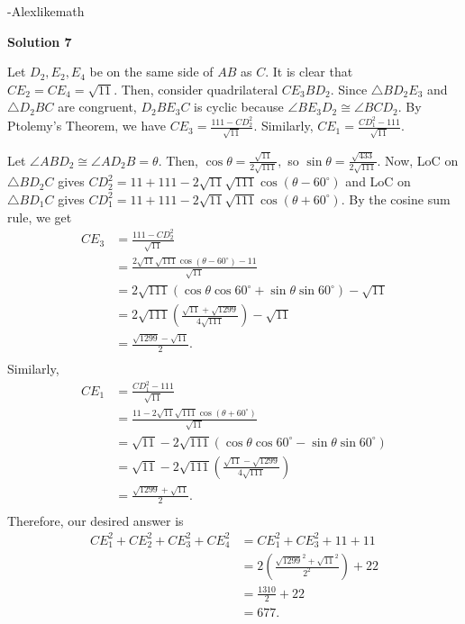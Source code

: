 \begin{enumerate}
 -Alexlikemath

 



\textbf{Solution 7}

Let $D_2, E_2, E_4$ be on the same side of $AB$ as $C.$ It is clear that $CE_2=CE_4=\sqrt{11}.$ Then, consider quadrilateral $CE_3BD_2.$ Since $\triangle BD_2E_3$ and $\triangle D_2BC$ are congruent, $D_2BE_3C$ is cyclic because $\angle BE_3D_2\cong\angle BCD_2.$ By Ptolemy's Theorem, we have $CE_3=\frac{111-CD_2^2}{\sqrt{11}}.$ Similarly, $CE_1=\frac{CD_1^2-111}{\sqrt{11}}.$

 Let $\angle ABD_2\cong\angle AD_2B=\theta.$ Then, $\cos\theta=\frac{\sqrt{11}}{2\sqrt{111}},$ so $\sin\theta=\frac{\sqrt{433}}{2\sqrt{111}}.$ Now, LoC on $\triangle BD_2C$ gives $CD_2^2=11+111-2\sqrt{11}\sqrt{111}\cos (\theta-60^\circ)$ and LoC on $\triangle BD_1C$ gives $CD_1^2=11+111-2\sqrt{11}\sqrt{111}\cos (\theta+60^\circ).$ By the cosine sum rule, we get\begin{align*}CE_3&=\frac{111-CD_2^2}{\sqrt{11}}\\&=\frac{2\sqrt{11}\sqrt{111}\cos (\theta-60^\circ)-11}{\sqrt{11}}\\&=2\sqrt{111}(\cos\theta\cos 60^\circ+\sin\theta\sin 60^\circ)-\sqrt{11}\\&=2\sqrt{111}\left(\frac{\sqrt{11}+\sqrt{1299}}{4\sqrt{111}}\right)-\sqrt{11}\\&=\frac{\sqrt{1299}-\sqrt{11}}{2}.\\\end{align*}
Similarly,\begin{align*}CE_1&=\frac{CD_1^2-111}{\sqrt{11}}\\&=\frac{11-2\sqrt{11}\sqrt{111}\cos (\theta+60^\circ)}{\sqrt{11}}\\&=\sqrt{11}-2\sqrt{111}(\cos\theta\cos 60^\circ-\sin\theta\sin 60^\circ)\\&=\sqrt{11}-2\sqrt{111}\left(\frac{\sqrt{11}-\sqrt{1299}}{4\sqrt{111}}\right)\\&=\frac{\sqrt{1299}+\sqrt{11}}{2}.\\\end{align*}
Therefore, our desired answer is\begin{align*}CE_1^2+CE_2^2+CE_3^2+CE_4^2&=CE_1^2+CE_3^2+11+11\\&=2\left(\frac{\sqrt{1299}^2+\sqrt{11}^2}{2^2}\right)+22\\&=\frac{1310}{2}+22\\&=\boxed{677}.\\\end{align*}



\end{enumerate}

